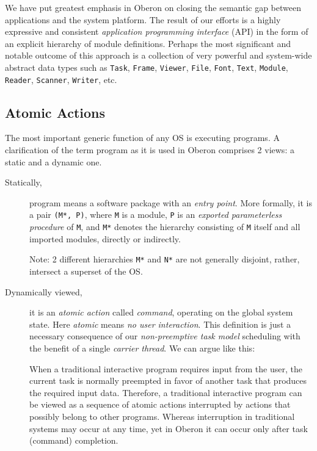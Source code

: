 We have put greatest emphasis in Oberon on closing the semantic gap between applications
and the system platform. The result of our efforts is a highly expressive and consistent
\emph{application programming interface} (API) in the form of an explicit hierarchy of
module definitions. Perhaps the most significant and notable outcome of this approach is
a collection of very powerful and system-wide abstract data types such as \verb|Task|,
\verb|Frame|, \verb|Viewer|, \verb|File|, \verb|Font|, \verb|Text|, \verb|Module|,
\verb|Reader|, \verb|Scanner|, \verb|Writer|, etc.

\subsection{Atomic Actions}
The most important generic function of any OS is executing programs. A clarification of
the term program as it is used in Oberon comprises 2 views: a static and a dynamic one.
\begin{description}
  \item[Statically,] program means a software package with an \emph{entry point}.
More formally, it is a pair \verb|(M*, P)|, where \verb|M| is a module, \verb|P| is an
\emph{exported parameterless procedure} of \verb|M|, and \verb|M*| denotes the hierarchy
consisting of \verb|M| itself and all imported modules, directly or indirectly.

Note: 2 different hierarchies \verb|M*| and \verb|N*| are not generally disjoint, rather,
intersect a superset of the OS.

  \item[Dynamically viewed,] it is an \emph{atomic action} called \emph{command},
operating on the global system state. Here \emph{atomic} means \emph{no user interaction}.
This definition is just a necessary consequence of our \emph{non-preemptive task model}
scheduling with the benefit of a single \emph{carrier thread}. We can argue like this:

When a traditional interactive program requires input from the user, the current task is
normally preempted in favor of another task that produces the required input data. Therefore,
a traditional interactive program can be viewed as a sequence of atomic actions interrupted
by actions that possibly belong to other programs. Whereas interruption in traditional systems
may occur at any time, yet in Oberon it can occur only after task (command) completion.
\end{description}

